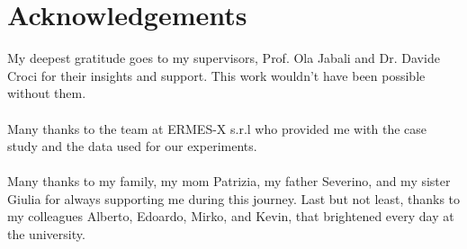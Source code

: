 \documentclass[11pt,a4paper,twocolumn]{article}
\begin{document}
\section{Acknowledgements}
My deepest gratitude goes to my supervisors, Prof. Ola Jabali and Dr. Davide Croci for their insights and support.
This work wouldn't have been possible without them.\\
\\
Many thanks to the team at ERMES-X s.r.l who provided me with the case study and the data used for our experiments.\\
\\
Many thanks to my family, my mom Patrizia, my father Severino, and my sister Giulia for always supporting me during this journey.
Last but not least, thanks to my colleagues Alberto, Edoardo, Mirko, and Kevin, that brightened every day at the university.

\end{document}

